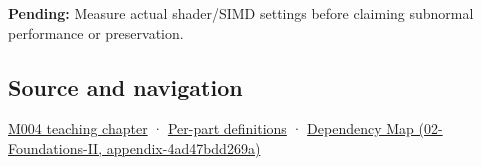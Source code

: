 \textbf{Pending:} Measure actual shader/SIMD settings before claiming subnormal performance or preservation.

\subsection{Source and navigation}\label{appendix-e979eb012782-source-and-navigation}

\hyperref[01-foundations-i-ch001-a-stretching-ruler-for-real-valued-quantities]{M004 teaching chapter} · \hyperref[appendix-fd090d982a15-m004---parts-61-76]{Per-part definitions} · \href{../02-Foundations-II/main.pdf\#nameddest=appendix-4ad47bdd269a}{Dependency Map (02-Foundations-II, appendix-4ad47bdd269a)}
